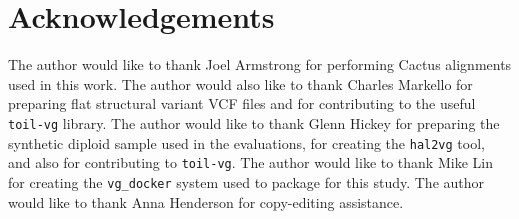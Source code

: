 \section{Acknowledgements}

The author would like to thank Joel Armstrong for performing Cactus alignments used in this work. The author would also like to thank Charles Markello for preparing flat structural variant VCF files and for contributing to the useful \texttt{toil-vg} library. The author would like to thank Glenn Hickey for preparing the synthetic diploid sample used in the evaluations, for creating the \texttt{hal2vg} tool, and also for contributing to \texttt{toil-vg}. The author would like to thank Mike Lin for creating the \texttt{vg\_docker} system used to package \vg for this study. The author would like to thank Anna Henderson for copy-editing assistance.

        
            
